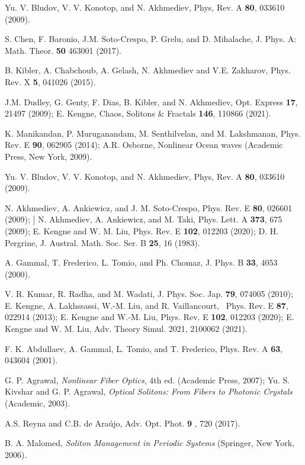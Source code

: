 \documentclass[preprintnumbers]{revtex4}
\begin{document}
\begin{thebibliography}{99}
 Yu. V. Bludov, V. V. Konotop, and N. Akhmediev, Phys, Rev.
A \textbf{80}, 033610 (2009).

 S. Chen, F. Baronio, J.M. Soto-Crespo, P. Grelu, and D.
Mihalache, J. Phys. A: Math. Theor. \textbf{50} 463001 (2017).

 B. Kibler, A. Chabchoub, A. Gelash, N. Akhmediev and V.E.
Zakharov, Phys. Rev. X \textbf{5}, 041026 (2015).

 J.M. Dudley, G. Genty, F. Dias, B. Kibler, and N. Akhmediev,
Opt. Express \textbf{17}, 21497 (2009); E. Kengne, Chaos, Solitons \&
Fractals \textbf{146}, 110866 (2021).

 K. Manikandan, P. Muruganandam, M. Senthilvelan, and M.
Lakshmanan, Phys. Rev. E \textbf{90}, 062905 (2014); A.R. Osborne, Nonlinear
Ocean waves (Academic Press, New York, 2009).

 Yu. V. Bludov, V. V. Konotop, and N. Akhmediev, Phys, Rev. A
\textbf{80}, 033610 (2009).

 N. Akhmediev, A. Ankiewicz, and J. M. Soto-Crespo, Phys. Rev.
E \textbf{80}, 026601 (2009); ] N. Akhmediev, A. Ankiewicz, and M. Taki,
Phys. Lett. A \textbf{373}, 675 (2009); E. Kengne and W. M. Liu, Phys. Rev.
E \textbf{102}, 012203 (2020); D. H. Pergrine, J. Austral. Math. Soc. Ser. B
\textbf{25}, 16 (1983).

 A. Gammal, T. Frederico, L. Tomio, and Ph. Chomaz, J. Phys. B
\textbf{33}, 4053 (2000).

 V. R. Kumar, R. Radha, and M. Wadati, J. Phys. Soc. Jap.
\textbf{79}, 074005 (2010); E. Kengne, A. Lakhssassi, W.-M. Liu, and R.
Vaillancourt, \ Phys. Rev. E \textbf{87}, 022914 (2013); E. Kengne and W.-M.
Liu, Phys. Rev. E \textbf{102}, 012203 (2020); E. Kengne and W. M. Liu, Adv.
Theory Simul. 2021, 2100062 (2021).

 F. K. Abdullaev, A. Gammal, L. Tomio, and T. Frederico,
Phys. Rev. A \textbf{63}, 043604 (2001).

 G. P. Agrawal, \textit{Nonlinear Fiber Optics}, 4th ed.
(Academic Press, 2007); Yu. S. Kivshar and G. P. Agrawal, \textit{Optical
Solitons: From Fibers to Photonic Crystals} (Academic, 2003).

 A.S. Reyna and C.B. de Ara\'{u}jo, Adv. Opt. Phot. \textbf{9}%
, 720 (2017).

 B. A. Malomed, \textit{Soliton Management in Periodic Systems}
(Springer, New York, 2006).


\end{thebibliography}
\end{document}
